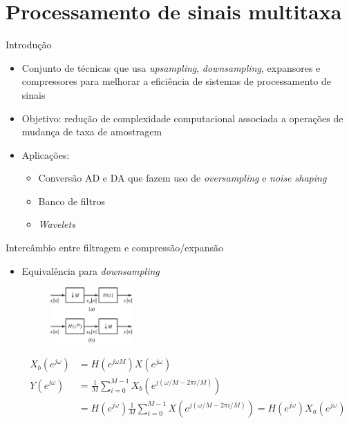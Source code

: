 \documentclass[
size=11pt,
paper=screen,
mode=present,
display=slidesnotes,
style=paintings,
nopagebreaks,
blackslide,
fleqn]{powerdot}
\begin{document}
\section{Processamento de sinais multitaxa}
\begin{slide}{Introdução}
	\begin{itemize}
		\item Conjunto de técnicas que usa \emph{upsampling}, \emph{downsampling}, expansores e compressores para melhorar a eficiência de sistemas de processamento de sinais
		\item Objetivo: redução de complexidade computacional associada a operações de mudança de taxa de amostragem
		\item Aplicações:
			\begin{itemize}
				\item Conversão AD e DA que fazem uso de \emph{oversampling} e \emph{noise shaping}
				\item Banco de filtros
				\item \emph{Wavelets}
			\end{itemize}
	\end{itemize}
\end{slide}

\begin{slide}{Intercâmbio entre filtragem e compressão/expansão}
	\begin{itemize}
		\item Equivalência para \emph{downsampling}
			\begin{figure}
				\centering
				\includegraphics[width=0.3\textwidth]{figs/4-31.eps}
			\end{figure}
			\begin{align*}
				X_b(e^{j\omega}) &=H(e^{j\omega M}) X(e^{j\omega})\\
				Y(e^{j\omega})&= \frac{1}{M} \sum_{i=0}^{M-1} X_b(e^{j(\omega/M - 2\pi i/M)})\\
				&= H(e^{j\omega})\frac{1}{M} \sum_{i=0}^{M-1} X(e^{j(\omega/M - 2\pi i/M)}) = H(e^{j\omega})X_a(e^{j\omega})
			\end{align*}
	\end{itemize}
			
\end{slide}
\end{document}
